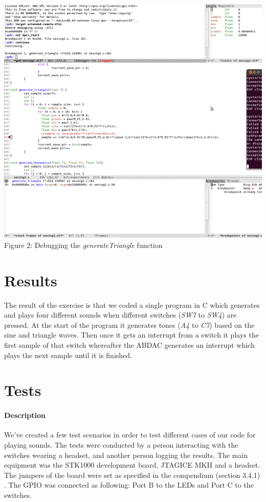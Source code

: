 \documentclass[a4paper,11pt]{article}
\begin{document}
\begin{center}

\includegraphics{images/debugsmall.png}
Figure 2: Debugging the \emph{generateTriangle} function
\end{center}

\section{Results}
The result of the exercise is that we coded a single program in C which generates and plays four different sounds when different switches (\emph{SW7} to \emph{SW4}) are pressed. At the start of the program it generates tones (\emph{A4} to \emph{C7}) based on the sine and triangle waves. Then once it gets an interrupt from a switch it plays the first sample of that switch whereafter the ABDAC generates an interrupt which plays the next sample until it is finished.

\section{Tests}
\paragraph{Description}
We've created a few test scenarios in order to test different cases of our code for playing sounds. The tests were conducted by a person interacting with the switches wearing a headset, and another person logging the results. The main equipment was the STK1000 development board, JTAGICE MKII and a headset. The jumpers of the board were set as specified in the compendium (section 3.4.1) \cite{komp}. The GPIO was connected as following: Port B to the LEDs and Port C to the switches.
\end{document}
